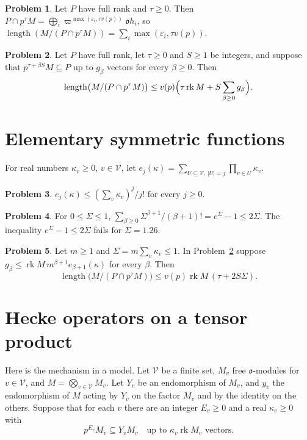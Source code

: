 \documentclass[reqno]{amsart}
\theoremstyle{definition}
\newtheorem{problem}{Problem}[section]
\theoremstyle{plain}
\theoremstyle{remark}
\newcommand{\rk}{\operatorname{rk}}
\newcommand{\len}{\operatorname{length}}
\newcommand{\vo}{\mathfrak o}
\newcommand{\Vc}{\mathcal V}
\begin{document}
\begin{problem}\label{pr:length-cut}
Let \(P\) have full rank and \(\tau\ge0\).  Then \(P\cap p^\tau M=\bigoplus_i\varpi^{\max(\varepsilon_i,\tau v(p))}\vo h_i\), so \(\len(M/(P\cap p^\tau M))=\sum_i\max(\varepsilon_i,\tau v(p))\).
\end{problem}

\begin{problem}\label{pr:length-from-cover}
Let \(P\) have full rank, let \(\tau\ge0\) and \(S\ge1\) be integers, and suppose that \(p^{\tau+\beta S}M\subseteq P\) up to \(g_\beta\) vectors for every \(\beta\ge0\).  Then
\[
 \len\bigl(M/(P\cap p^\tau M)\bigr)\le v(p)\Bigl(\tau\rk M+S\sum_{\beta\ge0}g_\beta\Bigr).
\]
\end{problem}

\section{Elementary symmetric functions}\label{sec:sym}

For real numbers \(\kappa_v\ge0\), \(v\in\Vc\), let \(e_j(\kappa)=\sum_{U\subseteq\Vc,\,\lvert U\rvert=j}\prod_{v\in U}\kappa_v\).

\begin{problem}\label{pr:maclaurin}
\(e_j(\kappa)\le(\sum_v\kappa_v)^j/j!\) for every \(j\ge0\).
\end{problem}

\begin{problem}\label{pr:exp}
For \(0\le\Sigma\le1\), \(\sum_{\beta\ge0}\Sigma^{\beta+1}/(\beta+1)!=e^\Sigma-1\le2\Sigma\).  The inequality \(e^\Sigma-1\le2\Sigma\) fails for \(\Sigma=1.26\).
\end{problem}

\begin{problem}\label{pr:combine}
Let \(m\ge1\) and \(\Sigma=m\sum_v\kappa_v\le1\).  In Problem~\ref{pr:length-from-cover} suppose \(g_\beta\le\rk M\,m^{\beta+1}e_{\beta+1}(\kappa)\) for every \(\beta\).  Then
\[
 \len\bigl(M/(P\cap p^\tau M)\bigr)\le v(p)\rk M\,(\tau+2S\Sigma).
\]
\end{problem}

\section{Hecke operators on a tensor product}\label{sec:tensor}

Here is the mechanism in a model.  Let \(\Vc\) be a finite set, \(M_v\) free \(\vo\)-modules for \(v\in\Vc\), and \(M=\bigotimes_{v\in\Vc}M_v\).  Let \(Y_v\) be an endomorphism of \(M_v\), and \(y_v\) the endomorphism of \(M\) acting by \(Y_v\) on the factor \(M_v\) and by the identity on the others.  Suppose that for each \(v\) there are an integer \(E_v\ge0\) and a real \(\kappa_v\ge0\) with
\[
 p^{E_v}M_v\subseteq Y_vM_v\quad\text{up to }\kappa_v\rk M_v\text{ vectors}.
\]
\end{document}
